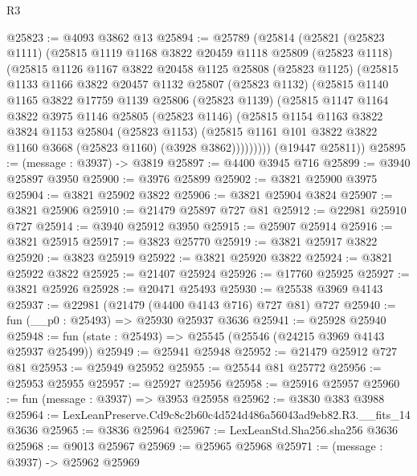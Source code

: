 \begin{lexlean}{R3}
\begin{coremodule}
@25823 := @4093 @3862 @13
@25894 := @25789
    (@25814
      (@25821
        (@25823 @1111)
        (@25815
          @1119
          @1168
          @3822
          @20459
          @1118
          @25809
          (@25823 @1118)
          (@25815
            @1126
            @1167
            @3822
            @20458
            @1125
            @25808
            (@25823 @1125)
            (@25815
              @1133
              @1166
              @3822
              @20457
              @1132
              @25807
              (@25823 @1132)
              (@25815
                @1140
                @1165
                @3822
                @17759
                @1139
                @25806
                (@25823 @1139)
                (@25815
                  @1147
                  @1164
                  @3822
                  @3975
                  @1146
                  @25805
                  (@25823 @1146)
                  (@25815
                    @1154
                    @1163
                    @3822
                    @3824
                    @1153
                    @25804
                    (@25823 @1153)
                    (@25815 @1161 @101 @3822 @3822 @1160 @3668 (@25823 @1160) (@3928 @3862)))))))))
      (@19447 @25811))
@25895 := (message : @3937) -> @3819
@25897 := @4400 @3945 @716
@25899 := @3940 @25897 @3950
@25900 := @3976 @25899
@25902 := @3821 @25900 @3975
@25904 := @3821 @25902 @3822
@25906 := @3821 @25904 @3824
@25907 := @3821 @25906
@25910 := @21479 @25897 @727 @81
@25912 := @22981 @25910 @727
@25914 := @3940 @25912 @3950
@25915 := @25907 @25914
@25916 := @3821 @25915
@25917 := @3823 @25770
@25919 := @3821 @25917 @3822
@25920 := @3823 @25919
@25922 := @3821 @25920 @3822
@25924 := @3821 @25922 @3822
@25925 := @21407 @25924
@25926 := @17760 @25925
@25927 := @3821 @25926
@25928 := @20471 @25493
@25930 := @25538 @3969 @4143
@25937 := @22981 (@21479 (@4400 @4143 @716) @727 @81) @727
@25940 := fun (__p0 : @25493) => @25930 @25937 @3636
@25941 := @25928 @25940
@25948 := fun (state : @25493) => @25545 (@25546 (@24215 @3969 @4143 @25937 @25499))
@25949 := @25941 @25948
@25952 := @21479 @25912 @727 @81
@25953 := @25949 @25952
@25955 := @25544 @81 @25772
@25956 := @25953 @25955
@25957 := @25927 @25956
@25958 := @25916 @25957
@25960 := fun (message : @3937) => @3953 @25958
@25962 := @3830 @383 @3988
@25964 := LexLeanPreserve.Cd9c8c2b60c4d524d486a56043ad9eb82.R3.__fits_14 @3636
@25965 := @3836 @25964
@25967 := LexLeanStd.Sha256.sha256 @3636
@25968 := @9013 @25967
@25969 := @25965 @25968
@25971 := (message : @3937) -> @25962 @25969

\end{coremodule}
\end{lexlean}
